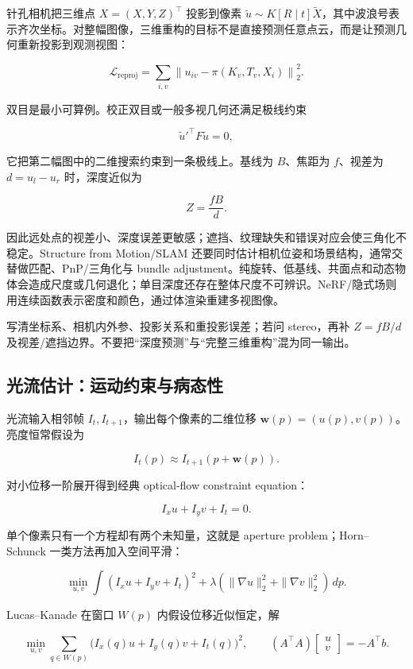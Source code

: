 \documentclass[11pt]{ctexart}
\begin{document}
针孔相机把三维点 \(X=(X,Y,Z)^\top\) 投影到像素 \(\tilde u\sim K[R\mid t]\tilde X\)，其中波浪号表示齐次坐标。对整幅图像，三维重构的目标不是直接预测任意点云，而是让预测几何重新投影到观测视图：

\[
  \mathcal{L}_{\mathrm{reproj}}
  =
  \sum_{i,v}
  \left\|
    u_{iv}-\pi(K_v,T_v,X_i)
  \right\|_2^2.
\]

双目是最小可算例。校正双目或一般多视几何还满足极线约束

\[
  \tilde u'^{\top}F\tilde u=0,
\]

它把第二幅图中的二维搜索约束到一条极线上。基线为 \(B\)、焦距为 \(f\)、视差为 \(d=u_l-u_r\) 时，深度近似为

\[
  Z=\frac{fB}{d}.
\]

因此远处点的视差小、深度误差更敏感；遮挡、纹理缺失和错误对应会使三角化不稳定。Structure from Motion/SLAM 还要同时估计相机位姿和场景结构，通常交替做匹配、PnP/三角化与 bundle adjustment。纯旋转、低基线、共面点和动态物体会造成尺度或几何退化；单目深度还存在整体尺度不可辨识。NeRF/隐式场则用连续函数表示密度和颜色，通过体渲染重建多视图像。

\begin{examnote}[三维题答题骨架]
写清坐标系、相机内外参、投影关系和重投影误差；若问 stereo，再补 \(Z=fB/d\) 及视差/遮挡边界。不要把“深度预测”与“完整三维重构”混为同一输出。
\end{examnote}

\subsection{光流估计：运动约束与病态性}

光流输入相邻帧 \(I_t,I_{t+1}\)，输出每个像素的二维位移 \(\mathbf w(p)=(u(p),v(p))\)。亮度恒常假设为

\[
  I_t(p)\approx I_{t+1}(p+\mathbf w(p)).
\]

对小位移一阶展开得到经典 optical-flow constraint equation：

\[
  I_xu+I_yv+I_t=0.
\]

单个像素只有一个方程却有两个未知量，这就是 aperture problem；Horn--Schunck 一类方法再加入空间平滑：

\[
  \min_{u,v}
  \int
  (I_xu+I_yv+I_t)^2
  +\lambda(\|\nabla u\|_2^2+\|\nabla v\|_2^2)\,dp.
\]

Lucas--Kanade 在窗口 \(W(p)\) 内假设位移近似恒定，解

\[
  \min_{u,v}\sum_{q\in W(p)}
  \bigl(I_x(q)u+I_y(q)v+I_t(q)\bigr)^2,
  \qquad
  (A^\top A)\begin{bmatrix}u\\v\end{bmatrix}
  =-A^\top b.
\]
\end{document}
